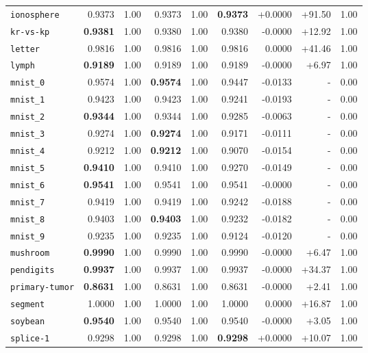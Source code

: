 \begin{tabular}{lrrrrrrrr}
\texttt{ionosphere} & 0.9373 & 1.00 & 0.9373 & 1.00 & \textbf{0.9373} & +0.0000 & +91.50 & 1.00\\
\texttt{kr-vs-kp} & \textbf{0.9381} & 1.00 & 0.9380 & 1.00 & 0.9380 & -0.0000 & +12.92 & 1.00\\
\texttt{letter} & 0.9816 & 1.00 & 0.9816 & 1.00 & 0.9816 & 0.0000 & +41.46 & 1.00\\
\texttt{lymph} & \textbf{0.9189} & 1.00 & 0.9189 & 1.00 & 0.9189 & -0.0000 & +6.97 & 1.00\\
\texttt{mnist\_0} & 0.9574 & 1.00 & \textbf{0.9574} & 1.00 & 0.9447 & -0.0133 & - & 0.00\\
\texttt{mnist\_1} & 0.9423 & 1.00 & 0.9423 & 1.00 & 0.9241 & -0.0193 & - & 0.00\\
\texttt{mnist\_2} & \textbf{0.9344} & 1.00 & 0.9344 & 1.00 & 0.9285 & -0.0063 & - & 0.00\\
\texttt{mnist\_3} & 0.9274 & 1.00 & \textbf{0.9274} & 1.00 & 0.9171 & -0.0111 & - & 0.00\\
\texttt{mnist\_4} & 0.9212 & 1.00 & \textbf{0.9212} & 1.00 & 0.9070 & -0.0154 & - & 0.00\\
\texttt{mnist\_5} & \textbf{0.9410} & 1.00 & 0.9410 & 1.00 & 0.9270 & -0.0149 & - & 0.00\\
\texttt{mnist\_6} & \textbf{0.9541} & 1.00 & 0.9541 & 1.00 & 0.9541 & -0.0000 & - & 0.00\\
\texttt{mnist\_7} & 0.9419 & 1.00 & 0.9419 & 1.00 & 0.9242 & -0.0188 & - & 0.00\\
\texttt{mnist\_8} & 0.9403 & 1.00 & \textbf{0.9403} & 1.00 & 0.9232 & -0.0182 & - & 0.00\\
\texttt{mnist\_9} & 0.9235 & 1.00 & 0.9235 & 1.00 & 0.9124 & -0.0120 & - & 0.00\\
\texttt{mushroom} & \textbf{0.9990} & 1.00 & 0.9990 & 1.00 & 0.9990 & -0.0000 & +6.47 & 1.00\\
\texttt{pendigits} & \textbf{0.9937} & 1.00 & 0.9937 & 1.00 & 0.9937 & -0.0000 & +34.37 & 1.00\\
\texttt{primary-tumor} & \textbf{0.8631} & 1.00 & 0.8631 & 1.00 & 0.8631 & -0.0000 & +2.41 & 1.00\\
\texttt{segment} & 1.0000 & 1.00 & 1.0000 & 1.00 & 1.0000 & 0.0000 & +16.87 & 1.00\\
\texttt{soybean} & \textbf{0.9540} & 1.00 & 0.9540 & 1.00 & 0.9540 & -0.0000 & +3.05 & 1.00\\
\texttt{splice-1} & 0.9298 & 1.00 & 0.9298 & 1.00 & \textbf{0.9298} & +0.0000 & +10.07 & 1.00\\

\end{tabular}
